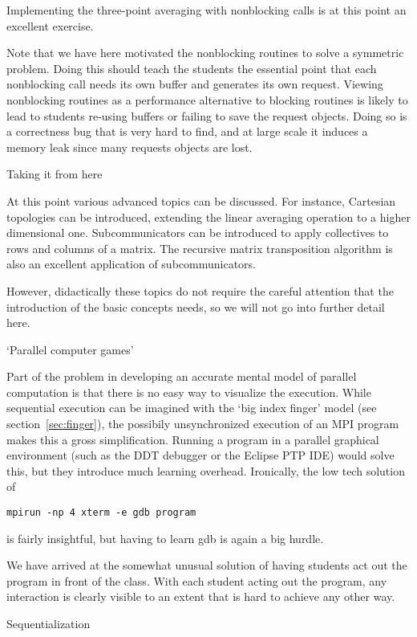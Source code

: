 Implementing the three-point averaging with nonblocking calls
is at this point an excellent exercise.

Note that we have here motivated the nonblocking
routines to solve a symmetric problem. Doing this should 
teach the students the essential point that each nonblocking
call needs its own buffer and generates its own request.
Viewing nonblocking routines as a performance alternative to blocking
routines is likely to lead to students re-using buffers or failing to
save the request objects.
Doing so is a correctness bug that is very hard to find, and
at large scale it induces a memory leak since many requests objects
are lost.

 {Taking it from here}

At this point various advanced topics can be discussed. For instance,
Cartesian topologies can be introduced, extending the linear averaging operation
to a higher dimensional one.
Subcommunicators can be introduced to apply collectives to rows and
columns of a matrix. The recursive matrix transposition algorithm is also
an excellent application of subcommunicators.

However, didactically these topics do not require the careful
attention that the introduction of the basic concepts needs, so we
will not go into further detail here.

 {`Parallel computer games'}
\label{sec:games}

Part of the problem in developing an accurate mental model of parallel
computation is that there is no easy way to visualize the execution.
While sequential execution can be imagined with the `big index finger'
model (see section~\ref{sec:finger}), the possibily unsynchronized
execution of an MPI program makes this a gross simplification.
Running a program in a parallel graphical environment (such as the DDT
debugger or the Eclipse PTP IDE) would solve this, but they introduce
much learning overhead. Ironically, the low tech solution of
\begin{verbatim}
mpirun -np 4 xterm -e gdb program
\end{verbatim}
is fairly insightful, but having to learn gdb is again a big hurdle.

We have arrived at the somewhat unusual solution of having students
act out the program in front of the class. With each student acting
out the program, any interaction is clearly visible to an extent that
is hard to achieve any other way.

 {Sequentialization}
\label{sec:seq-game}

